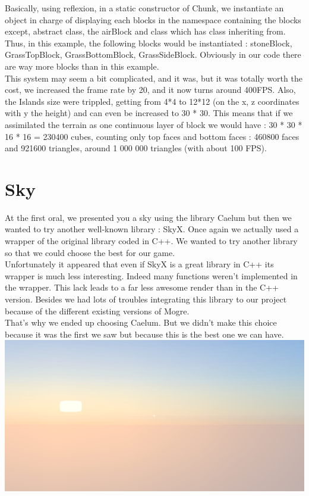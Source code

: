 \documentclass[article]{report}             %
\begin{document}
Basically, using reflexion, in a static constructor of Chunk, we instantiate an object in charge of displaying each blocks in the namespace containing the blocks except, abstract class, the airBlock and class which has class inheriting from.\\
Thus, in this example, the following blocks would be instantiated : stoneBlock, GrassTopBlock, GrassBottomBlock, GrassSideBlock. Obviously in our code there are way more blocks 
than in this example.\\


This system may seem a bit complicated, and it was, but it was totally worth the cost, we increased the frame rate by 20, and it now turns around 400FPS. Also, the Islands size were trippled, getting from 4*4 to 12*12 (on the x, z coordinates with y the height) and can even be increased to 30 * 30. This means that if we assimilated the terrain as one continuous layer of block we would have : 	30 * 30 * 16 * 16 = 230400 cubes, counting only top faces and bottom faces : 460800 faces and 921600 triangles, around 1 000 000 triangles (with about 100 FPS).
			
			\section{Sky}
				At the first oral, we presented you a sky using the library Caelum but then we wanted to try another well-known library : SkyX. Once again we actually used a wrapper of the original library coded in C++. We wanted to try another library so that we could choose the best for our game.\\
				
Unfortunately it appeared that even if SkyX is a great library in C++ its wrapper is much less interesting. Indeed many functions weren't implemented in the wrapper. This lack leads to a far less awesome render than in the C++ version. Besides we had lots of troubles integrating this library to our project because of the different existing versions of Mogre.\\

That's why we ended up choosing Caelum. But we didn't make this choice because it was the first we saw but because this is the best one we can have. \\

				\includegraphics[width = 16cm]{images/Graphics/sky.png}
\end{document}
